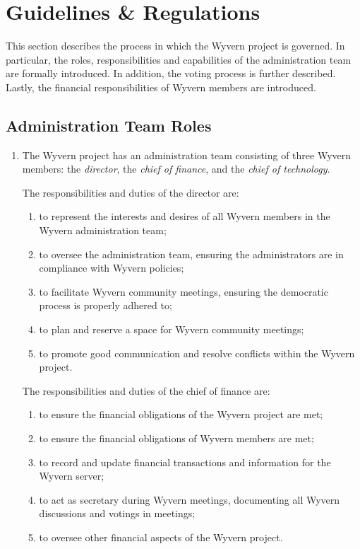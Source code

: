 \section{Guidelines \& Regulations}
\label{sec:bureaucracy}
This section describes the process in which the Wyvern project is governed. In particular, the roles, responsibilities and capabilities of the administration team are formally introduced. In addition, the voting process is further described. Lastly, the financial responsibilities of Wyvern members are introduced.

\subsection{Administration Team Roles}
\begin{enumerate}
    \item The Wyvern project has an administration team consisting of three Wyvern members: the \emph{director}, the \emph{chief of finance}, and the \emph{chief of technology}.
    
    \begin{item}
        The responsibilities and duties of the director are:
        \begin{enumerate}
            \item to represent the interests and desires of all Wyvern members in the Wyvern administration team;
            \item to oversee the administration team, ensuring the administrators are in compliance with Wyvern policies;
            \item to facilitate Wyvern community meetings, ensuring the democratic process is properly adhered to;
            \item to plan and reserve a space for Wyvern community meetings;
            \item to promote good communication and resolve conflicts within the Wyvern project.
        \end{enumerate}
    \end{item}

    \begin{item}
        The responsibilities and duties of the chief of finance are:
        \begin{enumerate}
            \item to ensure the financial obligations of the Wyvern project are met;
            \item to ensure the financial obligations of Wyvern members are met;
            \item to record and update financial transactions and information for the Wyvern server;
            \item to act as secretary during Wyvern meetings, documenting all Wyvern discussions and votings in meetings;
            \item to oversee other financial aspects of the Wyvern project.
        \end{enumerate}
    \end{item}


\end{enumerate}
